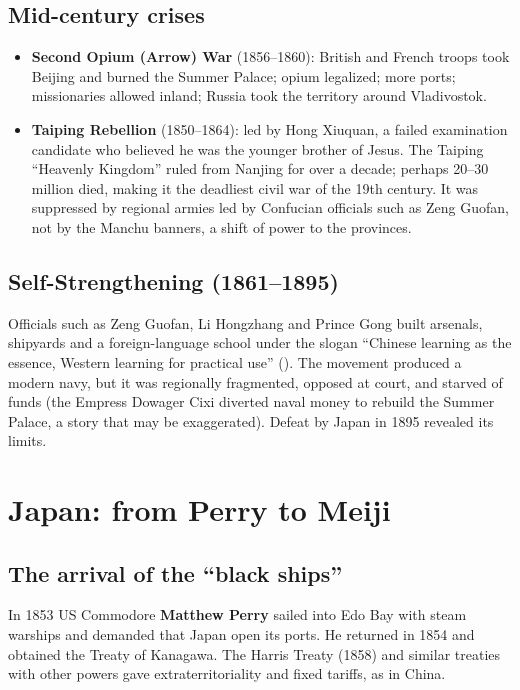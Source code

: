 \subsection{Mid-century crises}

\begin{itemize}
  \item \textbf{Second Opium (Arrow) War} (1856--1860): British and French troops took
        Beijing and burned the Summer Palace; opium legalized; more ports; missionaries
        allowed inland; Russia took the territory around Vladivostok.
  \item \textbf{Taiping Rebellion} (1850--1864): led by Hong Xiuquan, a failed examination
        candidate who believed he was the younger brother of Jesus. The Taiping
        ``Heavenly Kingdom'' ruled from Nanjing for over a decade; perhaps 20--30 million
        died, making it the deadliest civil war of the 19th century. It was suppressed by
        regional armies led by Confucian officials such as Zeng Guofan, not by the Manchu
        banners, a shift of power to the provinces.
\end{itemize}

\subsection{Self-Strengthening (1861--1895)}

Officials such as Zeng Guofan, Li Hongzhang and Prince Gong built arsenals, shipyards and a
foreign-language school under the slogan ``Chinese learning as the essence, Western
learning for practical use'' (). The movement produced a modern navy, but it
was regionally fragmented, opposed at court, and starved of funds (the Empress Dowager
Cixi diverted naval money to rebuild the Summer Palace, a story that may be exaggerated).
Defeat by Japan in 1895 revealed its limits.

\section{Japan: from Perry to Meiji}

\subsection{The arrival of the ``black ships''}

In 1853 US Commodore \textbf{Matthew Perry} sailed into Edo Bay with steam warships and
demanded that Japan open its ports. He returned in 1854 and obtained the Treaty of
Kanagawa. The Harris Treaty (1858) and similar treaties with other powers gave
extraterritoriality and fixed tariffs, as in China.

